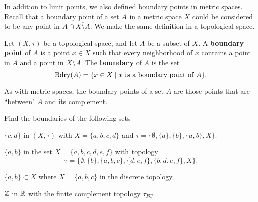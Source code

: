 \label{sec_set_boundary}

In addition to limit points, we also defined boundary points in metric spaces. Recall that a boundary point of a set $A$ in a metric space $X$ could be considered to be any point in $\overline{A} \cap \overline{X \setminus A}$. We make the same definition in a topological space. 

\begin{definition} Let $(X, \tau)$ be a topological space, and let $A$ be a subset of $X$. A \textbf{boundary point} of $A$ is a point $x \in X$ such that every neighborhood of $x$ contains a point in $A$ and a point in $X \setminus A$. The \textbf{boundary} of $A$ is the set 
\[\text{Bdry}(A) = \{x \in X \mid x \text{ is a boundary point of } A\}.\]
\end{definition}

As with metric spaces, the boundary points of a set $A$ are those points that are ``between" $A$ and its complement. 

\begin{activity} \label{act:TS_bl_examples} Find the boundaries of the following sets
\ba
\item $\{c,d\}$ in $(X, \tau)$ with $X= \{a,b,c,d\}$ and $\tau = \{\emptyset, \{a\}, \{b\}, \{a,b\}, X \}$.

\item $\{a,b\}$ in the set $X= \{a,b,c,d,e,f\}$ with topology 
\[\tau= \{\emptyset,\{b\}, \{a,b,c\},\{d,e,f\},\{b,d,e,f\}, X\}.\] 

\item $\{a,b\} \subset X$ where $X = \{a,b,c\}$ in the discrete topology.

\item $\mathbb{Z}$ in $\mathbb{R}$ with the finite complement topology $\tau_{FC}$. 

\ea

\end{activity}

